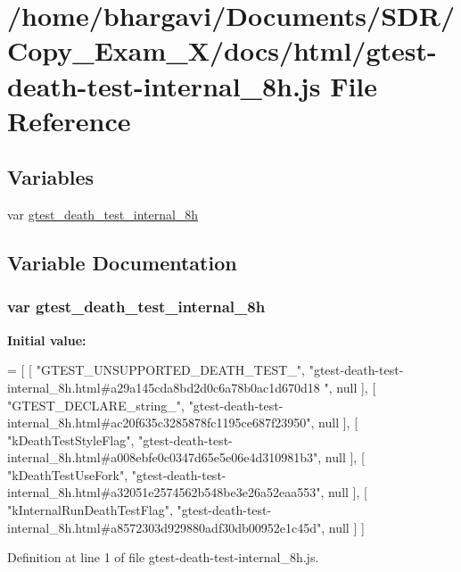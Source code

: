 \hypertarget{gtest-death-test-internal__8h_8js}{}\section{/home/bhargavi/\+Documents/\+S\+D\+R/\+Copy\+\_\+\+Exam\+\_\+X/docs/html/gtest-\/death-\/test-\/internal\+\_\+8h.js File Reference}
\label{gtest-death-test-internal__8h_8js}
\subsection*{Variables}
\begin{DoxyCompactItemize}
\item 
var \hyperlink{gtest-death-test-internal__8h_8js_a938c12f10a8fc567bb22f0f5b646d8c6}{gtest\+\_\+death\+\_\+test\+\_\+internal\+\_\+8h}
\end{DoxyCompactItemize}


\subsection{Variable Documentation}
\subsubsection[{\texorpdfstring{gtest\+\_\+death\+\_\+test\+\_\+internal\+\_\+8h}{gtest_death_test_internal_8h}}]{\setlength{\rightskip}{0pt plus 5cm}var gtest\+\_\+death\+\_\+test\+\_\+internal\+\_\+8h}\hypertarget{gtest-death-test-internal__8h_8js_a938c12f10a8fc567bb22f0f5b646d8c6}{}\label{gtest-death-test-internal__8h_8js_a938c12f10a8fc567bb22f0f5b646d8c6}
{\bfseries Initial value\+:}
\begin{DoxyCode}
=
[
    [ \textcolor{stringliteral}{"GTEST\_UNSUPPORTED\_DEATH\_TEST\_"}, \textcolor{stringliteral}{"gtest-death-test-internal\_8h.html#a29a145cda8bd2d0c6a78b0ac1d670d18
      "}, null ],
    [ \textcolor{stringliteral}{"GTEST\_DECLARE\_string\_"}, \textcolor{stringliteral}{"gtest-death-test-internal\_8h.html#ac20f635c3285878fc1195ce687f23950"}, null 
      ],
    [ \textcolor{stringliteral}{"kDeathTestStyleFlag"}, \textcolor{stringliteral}{"gtest-death-test-internal\_8h.html#a008ebfe0c0347d65e5e06e4d310981b3"}, null ],
    [ \textcolor{stringliteral}{"kDeathTestUseFork"}, \textcolor{stringliteral}{"gtest-death-test-internal\_8h.html#a32051e2574562b548be3e26a52eaa553"}, null ],
    [ \textcolor{stringliteral}{"kInternalRunDeathTestFlag"}, \textcolor{stringliteral}{"gtest-death-test-internal\_8h.html#a8572303d929880adf30db00952e1c45d"}, 
      null ]
]
\end{DoxyCode}


Definition at line 1 of file gtest-\/death-\/test-\/internal\+\_\+8h.\+js.

